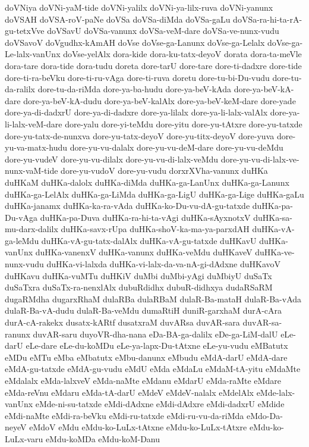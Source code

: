 {doVNiya
doVNi-yaM-tide
doVNi-yalilx
doVNi-ya-lilx-ruva
doVNi-yanunx
doVSAH
doVSA-roV-paNe
doVSa
doVSa-diMda
doVSa-gaLu
doVSa-ra-hi-ta-rA-gu-tetxVve
doVSavU
doVSa-vanunx
doVSa-veM-dare
doVSa-ve-nunx-vudu
doVSavoV
doVgudhx-kAmAH
doVse
doVse-ga-Lanunx
doVse-ga-Lelalx
doVse-ga-Le-lalx-vanUnx
doVse-yelAlx
dora-kide
dora-ku-tatx-deyoV
dorata
dora-ta-meVle
dora-tare
dora-tide
dora-tudu
doreta
dore-tarU
dore-tare
dore-ti-dadxre
dore-tide
dore-ti-ra-beVku
dore-ti-ru-vAga
dore-ti-ruva
doretu
dore-tu-bi-Du-vudu
dore-tu-da-ralilx
dore-tu-da-riMda
dore-ya-ba-hudu
dore-ya-beV-kAda
dore-ya-beV-kA-dare
dore-ya-beV-kA-dudu
dore-ya-beV-kalAlx
dore-ya-beV-keM-dare
dore-yade
dore-ya-di-dadxrU
dore-ya-di-dadxre
dore-ya-lilalx
dore-ya-li-lalx-valAlx
dore-ya-li-lalx-veM-dare
dore-yalu
dore-yi-teMdu
dore-yitu
dore-yu-tAtxre
dore-yu-tatxde
dore-yu-tatx-de-nunxva
dore-yu-tatx-deyoV
dore-yu-titx-deyoV
dore-yuva
dore-yu-va-matx-hudu
dore-yu-vu-dalalx
dore-yu-vu-deM-dare
dore-yu-vu-deMdu
dore-yu-vudeV
dore-yu-vu-dilalx
dore-yu-vu-di-lalx-veMdu
dore-yu-vu-di-lalx-ve-nunx-vaM-tide
dore-yu-vudoV
dore-yu-vudu
dorxrXVha-vanunx
duHKa
duHKaM
duHKa-dalolx
duHKa-diMda
duHKa-ga-LanUnx
duHKa-ga-Lanunx
duHKa-ga-LelAlx
duHKa-ga-LiMda
duHKa-ga-LigU
duHKa-ga-Lige
duHKa-gaLu
duHKa-janamx
duHKa-ka-ra-vAda
duHKa-ko-Du-vu-dA-gu-tatxde
duHKa-pa-Du-vAga
duHKa-pa-Duva
duHKa-ra-hi-ta-vAgi
duHKa-sAyxnotxV
duHKa-sa-mu-darx-dalilx
duHKa-savx-rUpa
duHKa-shoV-ka-ma-ya-parxdAH
duHKa-vA-ga-leMdu
duHKa-vA-gu-tatx-dalAlx
duHKa-vA-gu-tatxde
duHKavU
duHKa-vanUnx
duHKa-vanenxV
duHKa-vanunx
duHKa-veMdu
duHKaveV
duHKa-ve-nunx-vudu
duHKa-vi-lalxda
duHKa-vi-lalx-da-va-nA-gi-dAdxne
duHKavoV
duHKavu
duHKa-vuMTu
duHKiV
duMbi
duMbi-yAgi
duMbiyU
duSaTx
duSaTxra
duSaTx-ra-nenxlAlx
dubuRdidhx
dubuR-didhxya
dudaRSaRM
dugaRMdha
dugarxRhaM
dulaRBa
dulaRBaM
dulaR-Ba-mataH
dulaR-Ba-vAda
dulaR-Ba-vA-dudu
dulaR-Ba-veMdu
dumaRtiH
duniR-garxhaM
durA-cAra
durA-cA-rakekx
dusatx-kARtf
dusatxraM
duvARsa
duvAR-sara
duvAR-sa-ranunx
duvAR-saru
duyoVR-dha-nana
eDa-BA-ga-dalilx
eDe-ga-LiM-dalU
eLe-darU
eLe-dare
eLe-du-koMDu
eLe-ya-lapx-Du-tAtxne
eLe-yu-vudu
eMBatutx
eMDu
eMTu
eMba
eMbatutx
eMbu-danunx
eMbudu
eMdA-darU
eMdA-dare
eMdA-gu-tatxde
eMdA-gu-vudu
eMdU
eMda
eMdaLu
eMdaM-tA-yitu
eMdaMte
eMdalalx
eMda-lalxveV
eMda-naMte
eMdanu
eMdarU
eMda-raMte
eMdare
eMda-reVnu
eMdaru
eMda-tA-darU
eMdeV
eMdeV-nalalx
eMdelAlx
eMde-lalx-vanUnx
eMde-ni-su-tatxde
eMdi-dAdxne
eMdi-dAdxre
eMdi-dadxrU
eMdide
eMdi-naMte
eMdi-ra-beVku
eMdi-ru-tatxde
eMdi-ru-vu-da-riMda
eMdo-Da-neyeV
eMdoV
eMdu
eMdu-ko-LuLx-tAtxne
eMdu-ko-LuLx-tAtxre
eMdu-ko-LuLx-varu
eMdu-koMDa
eMdu-koM-Danu
}
